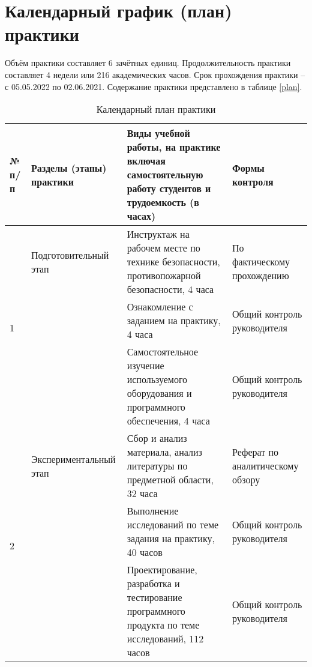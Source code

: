 \chapter{Календарный график (план) практики}

Объём практики составляет 6 зачётных единиц. Продолжительность
практики составляет 4 недели или 216 академических часов. Срок прохождения
практики – с 05.05.2022 по 02.06.2021. Содержание практики представлено в
таблице \ref{plan}.

\begin{table}[htp]
    \caption{Календарный план практики}
    \small
    \begin{tabular}{|p{}|p{}|p{}|p{}|}
        \hline
        \bf № п/п          & Разделы (этапы) практики                                                    & Виды учебной работы, на практике включая самостоятельную работу студентов и трудоемкость (в часах) & Формы контроля                   \\ \hline
        \multirow{3}{*}{1} & Подготовительный этап \multirow{3}{*}{}                                     & Инструктаж на рабочем месте по технике безопасности, противопожарной безопасности, 4 часа          & По фактическому прохождению      \\ \cline{3-4}
                           &                                                                             & Ознакомление с заданием на практику, 4 часа                                                        & Общий контроль руководителя      \\ \cline{3-4}
                           &                                                                             & Самостоятельное изучение используемого оборудования и программного обеспечения, 4 часа             & Общий контроль руководителя      \\ \hline
        \multirow{3}{*}{2} & Экспериментальный этап \multirow{3}{*}{}                                    & Сбор и анализ материала, анализ литературы по предметной области, 32 часа                          & Реферат по аналитическому обзору \\ \cline{3-4}
                           &                                                                             & Выполнение исследований по теме задания на практику, 40 часов                                      & Общий контроль руководителя      \\ \cline{3-4}
                           &                                                                             & Проектирование, разработка и тестирование программного продукта по теме исследований, 112 часов    & Общий контроль руководителя      \\ \hline

\end{tabular}
\end{table}
